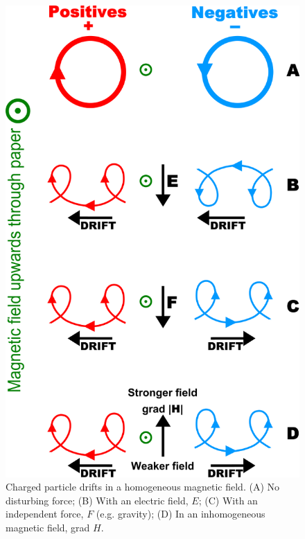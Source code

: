 \documentclass[12pt,a4paper]{article}
\begin{document}
\begin{figure}
\centering
\includegraphics[height=12.cm, angle=0]{Charged-particle-drifts.png}
\caption{Charged particle drifts in a homogeneous magnetic field. (A) No disturbing force; (B) With an electric field, $E$; (C) With an independent force, $F$ (e.g. gravity); (D) In an inhomogeneous magnetic field, grad $H$.
}
\label{fig:cpd}
\end{figure}
\end{document}
